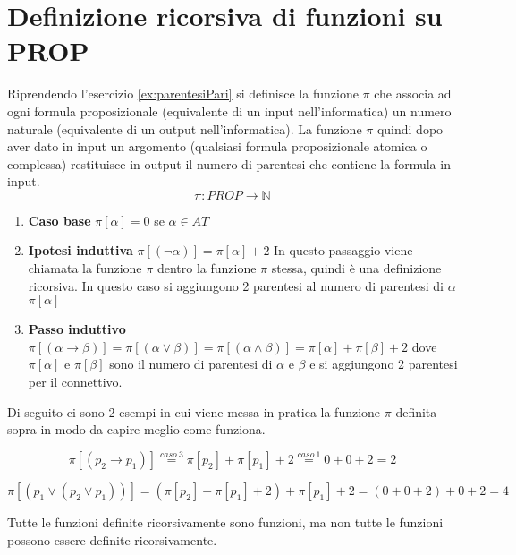 \documentclass{article}
\theoremstyle{break}
\theoremstyle{break}
\theoremstyle{break}
\theoremstyle{break}
\begin{document}
\section{Definizione ricorsiva di funzioni su PROP}
\begin{definition}
  Riprendendo l'esercizio \ref{ex:parentesiPari} si definisce la funzione \( \pi \) che associa ad ogni formula
  proposizionale (equivalente di un input nell'informatica) un numero naturale
  (equivalente di un output nell'informatica). La funzione \( \pi \) quindi dopo aver dato in input
  un argomento (qualsiasi formula proposizionale atomica o complessa) restituisce in output
  il numero di parentesi che contiene la formula in input.
  \[ \pi : PROP \to \mathbb{N} \]
  \begin{enumerate}
    \item \textbf{Caso base} \( \pi [\alpha] = 0 \) se \( \alpha \in AT \)
    \item \textbf{Ipotesi induttiva} \( \pi[(\neg \alpha)] = \pi[\alpha ] + 2 \) In questo passaggio viene
      chiamata la funzione \( \pi \) dentro la funzione \( \pi \) stessa, quindi è una definizione
      ricorsiva. In questo caso si aggiungono 2 parentesi al numero di parentesi di \( \alpha \) \(\pi[\alpha] \)
    \item \textbf{Passo induttivo} \( \pi[(\alpha \to \beta )] = \pi[(\alpha \vee \beta)] =
      \pi[(\alpha \wedge \beta )] = \pi[\alpha] + \pi[\beta] + 2\) dove \( \pi[\alpha ] \) e \( \pi[\beta ] \)
      sono il numero di parentesi di \( \alpha \) e \( \beta \) e si aggiungono 2 parentesi per
      il connettivo.
  \end{enumerate}
\end{definition}

Di seguito ci sono 2 esempi in cui viene messa in pratica la funzione \( \pi \) definita sopra in
modo da capire meglio come funziona.

\begin{example}
  \[
    \pi[(p_{2}\to p_{1})]\stackrel{caso \:3}{=}\pi[p_{2}]+\pi[p_{1}]+2\stackrel{caso \:1}{=}0+0+2=2
  \]
\end{example}
\begin{example}
  \[
    \pi[(p_{1}\vee (p_{2}\vee p_{1}))] = (\pi[p_{2}] + \pi[p_{1}] + 2) + \pi[p_{1}] + 2 = (0 + 0 + 2) + 0 + 2 = 4
  \]
\end{example}

Tutte le funzioni definite ricorsivamente sono funzioni, ma non tutte le funzioni possono essere definite ricorsivamente.
\end{document}
